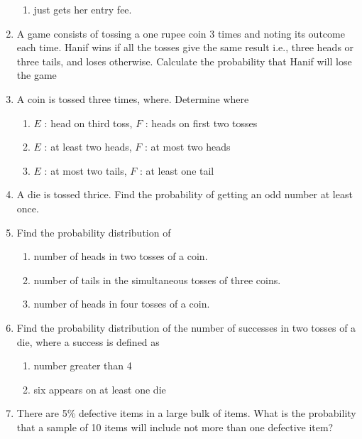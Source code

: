 \begin{enumerate}[label=\thesection.\arabic*,ref=\thesection.\theenumi]
\begin{enumerate}
	\item just gets her entry fee.
\end{enumerate}
\solution

	\item 
	A game consists of tossing a one rupee coin 3 times and noting its outcome each time. Hanif wins if all the tosses give the same result i.e., three heads or three tails, and loses otherwise. Calculate the probability that Hanif will lose the game
\\

%
\item A coin is tossed three times, where. Determine  where
\begin{enumerate}
\item $E$ : head on third toss, $F$ : heads on first two tosses
\item $E$ : at least two heads, $F$ : at most two heads
\item $E$ : at most two tails, $F$ : at least one tail
\end{enumerate}
\solution 

\item A die is tossed thrice. Find the probability of getting an odd number at least once.
		\\
	\solution

\item Find the probability distribution of
\begin{enumerate}
	\item number of heads in two tosses of a coin.
	\item number of tails in the simultaneous tosses of three coins.
	\item number of heads in four tosses of a coin.
\end{enumerate}
\solution

\item Find the probability distribution of the number of successes in two tosses of a die,
where a success is defined as\\
\begin{enumerate}
\item number greater than 4
\item six appears on at least one die
\end{enumerate}
\solution

\item There are 5\% defective items in a large bulk of items. What is the probability that a sample of 10 items will include not more than one defective item?

\end{enumerate}
